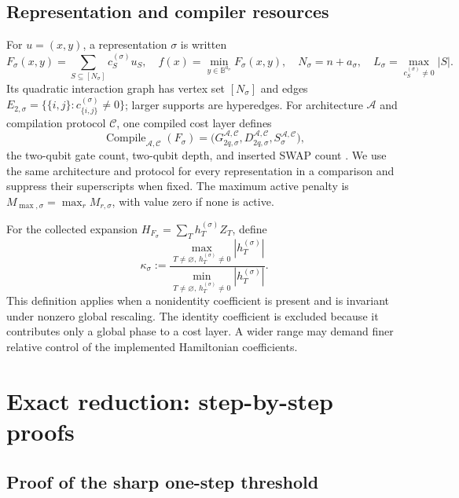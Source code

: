 \documentclass[a4paper,onecolumn,11pt,unpublished]{quantumarticle}
\theoremstyle{remark}
\begin{document}
\subsection{Representation and compiler resources}
For $u=(x,y)$, a representation $\sigma$ is written
\begin{equation}
  F_\sigma(x,y)=\sum_{S\subseteq[N_\sigma]}c_S^{(\sigma)}u_S,
  \quad f(x)=\min_{y\in\mathbb B^{a_\sigma}}F_\sigma(x,y),
  \quad N_\sigma=n+a_\sigma,
  \quad L_\sigma=\max_{c_S^{(\sigma)}\ne0}|S|.
  \label{eq:representation-data}
\end{equation}
Its quadratic interaction graph has vertex set $[N_\sigma]$ and edges
$E_{2,\sigma}=\{\{i,j\}:c_{\{i,j\}}^{(\sigma)}\ne0\}$;
larger supports are hyperedges. For architecture $\mathcal A$ and
compilation protocol $\mathcal C$, one compiled cost layer defines
\[
  \operatorname{Compile}_{\mathcal A,\mathcal C}(F_\sigma)
  =\bigl(G_{2q,\sigma}^{\mathcal A,\mathcal C},
         D_{2q,\sigma}^{\mathcal A,\mathcal C},
         S_\sigma^{\mathcal A,\mathcal C}\bigr),
\]
the two-qubit gate count, two-qubit depth, and inserted SWAP count
\cite{Weidenfeller2022,Schmidbauer2024,Rovara2026}.
We use the same architecture and protocol for every representation in a
comparison and suppress their superscripts when fixed.
The maximum active penalty is $M_{\max,\sigma}=\max_r M_{r,\sigma}$,
with value zero if none is active.

For the collected expansion
$H_{F_\sigma}=\sum_T h_T^{(\sigma)}Z_T$, define
\begin{equation}
  \kappa_\sigma:=
  \frac{\max_{T\ne\varnothing,\,h_T^{(\sigma)}\ne0}|h_T^{(\sigma)}|}
       {\min_{T\ne\varnothing,\,h_T^{(\sigma)}\ne0}|h_T^{(\sigma)}|}.
  \label{eq:pauli-dynamic-range}
\end{equation}
This definition applies when a nonidentity coefficient is present and is
invariant under nonzero global rescaling. The identity coefficient is
excluded because it contributes only a global phase to a cost layer.
A wider range may demand finer relative control of the implemented
Hamiltonian coefficients.

\section{Exact reduction: step-by-step proofs}
\label{app:general-reduction-proof}

\subsection{Proof of the sharp one-step threshold}
\label{app:sharp-one-step-proof}
\end{document}
